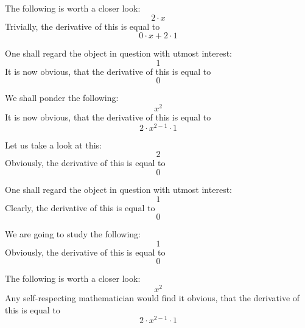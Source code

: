 \documentclass{article}
\begin{document}
The following is worth a closer look:
\begin{equation}
2 \cdot x 
\end{equation}
Trivially, the derivative of this is equal to
\begin{equation}
0 \cdot x + 2 \cdot 1 
\end{equation}

One shall regard the object in question with utmost interest:
\begin{equation}
1 
\end{equation}
It is now obvious, that the derivative of this is equal to
\begin{equation}
0 
\end{equation}

We shall ponder the following:
\begin{equation}
x ^{2 } 
\end{equation}
It is now obvious, that the derivative of this is equal to
\begin{equation}
2 \cdot x ^{2 - 1 } \cdot 1 
\end{equation}

Let us take a look at this:
\begin{equation}
2 
\end{equation}
Obviously, the derivative of this is equal to
\begin{equation}
0 
\end{equation}

One shall regard the object in question with utmost interest:
\begin{equation}
1 
\end{equation}
Clearly, the derivative of this is equal to
\begin{equation}
0 
\end{equation}

We are going to study the following:
\begin{equation}
1 
\end{equation}
Obviously, the derivative of this is equal to
\begin{equation}
0 
\end{equation}

The following is worth a closer look:
\begin{equation}
x ^{2 } 
\end{equation}
Any self-respecting mathematician would find it obvious, that the derivative of this is equal to
\begin{equation}
2 \cdot x ^{2 - 1 } \cdot 1 
\end{equation}
\end{document}
